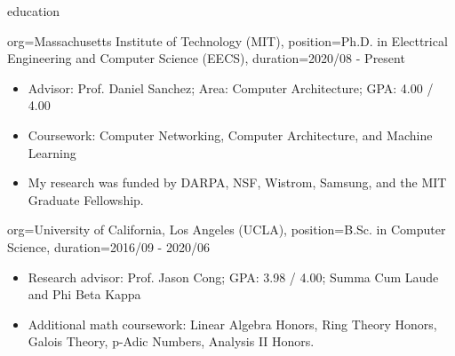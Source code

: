 \documentclass{resume}
\begin{document}

\begin{ResumeSection}{education}
    \begin{ResumeSubsection}{org={Massachusetts Institute of Technology (MIT)},
        position={Ph.D. in Electtrical Engineering and Computer Science (EECS)},
        duration={2020/08 - Present}}
        \begin{itemize}
            \item Advisor: Prof. Daniel Sanchez; Area: Computer Architecture; GPA: 4.00 / 4.00
            \item Coursework: Computer Networking, Computer Architecture, and Machine Learning
            \item My research was funded by DARPA, NSF, Wistrom, Samsung, and the MIT Graduate Fellowship.
        \end{itemize}
    \end{ResumeSubsection}

    \begin{ResumeSubsection}{org={University of California, Los Angeles (UCLA)},
        position={B.Sc. in Computer Science},
        duration={2016/09 - 2020/06}}
        \begin{itemize}
            \item Research advisor: Prof. Jason Cong; GPA: 3.98 / 4.00; Summa Cum Laude and Phi Beta Kappa
            \item Additional math coursework: Linear Algebra Honors, Ring Theory Honors,
                Galois Theory, p-Adic Numbers, Analysis II Honors.
        \end{itemize}
    \end{ResumeSubsection}
\end{ResumeSection}
\end{document}

